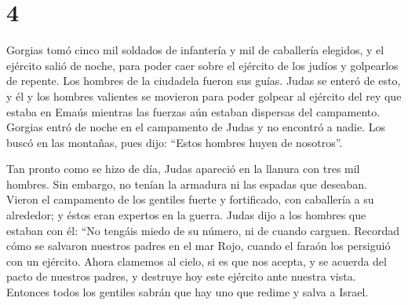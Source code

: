 \hypertarget{section-3}{%
\section{4}\label{section-3}}

 Gorgias tomó cinco mil soldados de infantería y mil de
caballería elegidos, y el ejército salió de noche,  para
poder caer sobre el ejército de los judíos y golpearlos de repente. Los
hombres de la ciudadela fueron sus guías.  Judas se enteró
de esto, y él y los hombres valientes se movieron para poder golpear al
ejército del rey que estaba en Emaús  mientras las fuerzas
aún estaban dispersas del campamento.  Gorgias entró de
noche en el campamento de Judas y no encontró a nadie. Los buscó en las
montañas, pues dijo: ``Estos hombres huyen de nosotros''.

 Tan pronto como se hizo de día, Judas apareció en la
llanura con tres mil hombres. Sin embargo, no tenían la armadura ni las
espadas que deseaban.  Vieron el campamento de los
gentiles fuerte y fortificado, con caballería a su alrededor; y éstos
eran expertos en la guerra.  Judas dijo a los hombres que
estaban con él: ``No tengáis miedo de su número, ni de cuando carguen.
 Recordad cómo se salvaron nuestros padres en el mar Rojo,
cuando el faraón los persiguió con un ejército.  Ahora
clamemos al cielo, si es que nos acepta, y se acuerda del pacto de
nuestros padres, y destruye hoy este ejército ante nuestra vista.
 Entonces todos los gentiles sabrán que hay uno que
redime y salva a Israel.

